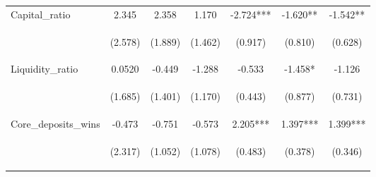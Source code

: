 \documentclass[]{article}
\begin{document}
\begin{center}
\begin{tabular}{lcccccc}
Capital\_ratio & 2.345 & 2.358 & 1.170 & -2.724*** & -1.620** & -1.542** \\
\vspace{4pt} & \begin{footnotesize}(2.578)\end{footnotesize} & \begin{footnotesize}(1.889)\end{footnotesize} & \begin{footnotesize}(1.462)\end{footnotesize} & \begin{footnotesize}(0.917)\end{footnotesize} & \begin{footnotesize}(0.810)\end{footnotesize} & \begin{footnotesize}(0.628)\end{footnotesize} \\
Liquidity\_ratio & 0.0520 & -0.449 & -1.288 & -0.533 & -1.458* & -1.126 \\
\vspace{4pt} & \begin{footnotesize}(1.685)\end{footnotesize} & \begin{footnotesize}(1.401)\end{footnotesize} & \begin{footnotesize}(1.170)\end{footnotesize} & \begin{footnotesize}(0.443)\end{footnotesize} & \begin{footnotesize}(0.877)\end{footnotesize} & \begin{footnotesize}(0.731)\end{footnotesize} \\
Core\_deposits\_wins & -0.473 & -0.751 & -0.573 & 2.205*** & 1.397*** & 1.399*** \\
\vspace{4pt} & \begin{footnotesize}(2.317)\end{footnotesize} & \begin{footnotesize}(1.052)\end{footnotesize} & \begin{footnotesize}(1.078)\end{footnotesize} & \begin{footnotesize}(0.483)\end{footnotesize} & \begin{footnotesize}(0.378)\end{footnotesize} & \begin{footnotesize}(0.346)\end{footnotesize} \\

\end{tabular}
\end{center}
\end{document}
